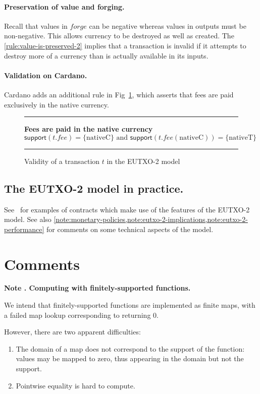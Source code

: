 \documentclass[a4paper]{article}
\newcounter{note}
\newcommand{\note}[1]{
  \bigskip
  \refstepcounter{note}
  \noindent\textbf{Note \thenote. #1}
}
\newcommand{\msf}[1]{\ensuremath{\mathsf{#1}}}
\newcommand{\mi}[1]{\ensuremath{\mathit{#1}}}
\newcommand\rfskip{7pt}
\newenvironment{ruledfigure}[1]{\begin{figure}[#1]\hrule\vspace{\rfskip}}{\vspace{\rfskip}\hrule\end{figure}}
\newcommand{\support}{\msf{support}}
\newcommand{\forge}{\mi{forge}}
\newcommand{\fee}{\mi{fee}}
\newcommand{\nativeCur}{\ensuremath{\mathrm{nativeC}}}
\newcommand{\nativeTok}{\ensuremath{\mathrm{nativeT}}}
\begin{document}
\paragraph{Preservation of value and forging.}
Recall that values in $\forge$ can
be negative whereas values in outputs must be non-negative. This allows
currency to be destroyed as well as created. The
\cref{rule:value-is-preserved-2} implies that a
transaction is invalid if it attempts to destroy more of a currency
than is actually available in its inputs.

\paragraph{Validation on Cardano.}
Cardano adds an additional rule in Fig~\ref{fig:cardano-fee-validity}, which
asserts that fees are paid exclusively in the native currency.

\begin{ruledfigure}{H}
  \textbf{Fees are paid in the native currency}
  \begin{displaymath}
    \support(t.\fee) = \{ \nativeCur \} \textrm{ and }
    \support(t.\fee(\nativeCur)) = \{ \nativeTok \}
  \end{displaymath}
  \caption{Validity of a transaction $t$ in the EUTXO-2 model}
  \label{fig:cardano-fee-validity}
\end{ruledfigure}

\subsection{The EUTXO-2 model in practice.}
See~\cite{Plutus-book} for examples of contracts which make use of the
features of the EUTXO-2 model.  See also
\cref{note:monetary-policies,note:eutxo-2-implications,note:eutxo-2-performance}
for comments on some technical aspects of the model.

\appendix
\section{Comments}
\label{appendix:comments}

\note{Computing with finitely-supported functions.}
\label{note:finitely-supported-functions}
We intend that finitely-supported functions are implemented as finite
maps, with a failed map lookup corresponding to returning 0.

However, there are two apparent difficulties:
\begin{enumerate}
  \item The domain of a map does not correspond to the support of the function:
    values may be mapped to zero, thus appearing in the domain but not the support.
  \item Pointwise equality is hard to compute.
\end{enumerate}
\end{document}
